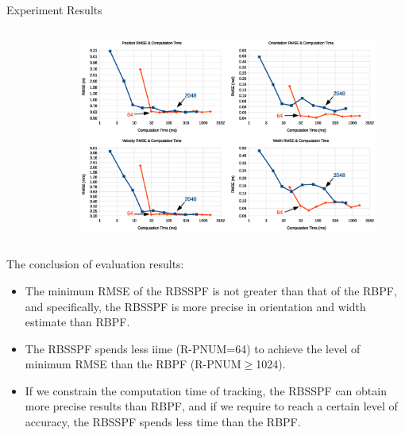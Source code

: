 \documentclass[final,hyperref={pdfpagelabels=false}]{beamer}
\begin{document}
\begin{frame}[t]
\begin{columns}[t]
\begin{column}{.48\textwidth}
\begin{block}{Experiment Results}
\begin{columns}[t]
\begin{column}{0.18\textwidth}
\begin{figure}
\end{figure}
\end{column}
\begin{column}{0.8\textwidth}
\begin{figure}
 \centering
 \includegraphics[width=1\textwidth]{./img/rmse.eps}
\end{figure}
\end{column}
\end{columns}

\vspace{1em}
\begin{columns}[c]
\begin{column}{0.4\textwidth}
The conclusion of evaluation results:
\begin{itemize}
	\item The minimum RMSE of the RBSSPF is not greater than that of the RBPF, and specifically, the RBSSPF is more precise in orientation and width estimate than RBPF.
	\item The RBSSPF spends less iime (R-PNUM=64) to achieve the level of minimum RMSE than the RBPF (R-PNUM$\geq$1024).
	\item If we constrain the computation time of tracking, the RBSSPF can obtain more precise results than RBPF, and if we require to	reach a certain level of accuracy, the RBSSPF spends less time than the RBPF.
	

\end{itemize}
\end{column}
\end{columns}
\end{block}
\end{column}
\end{columns}
\end{frame}
\end{document}
